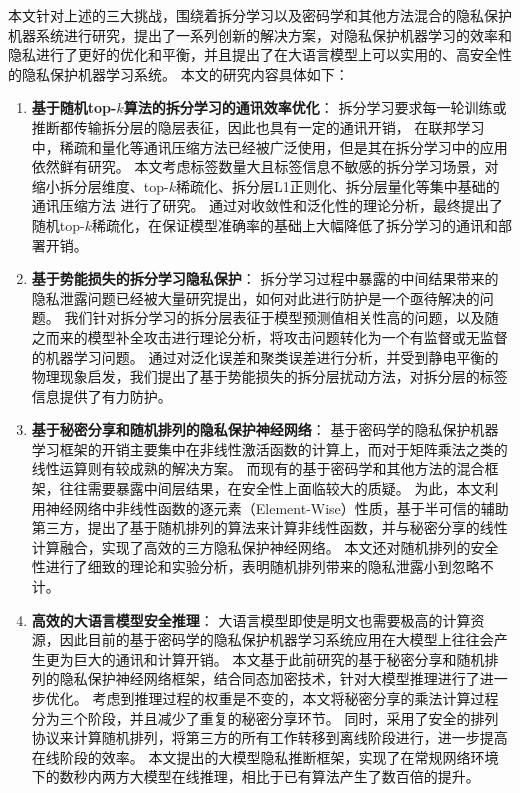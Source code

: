 本文针对上述的三大挑战，围绕着拆分学习以及密码学和其他方法混合的隐私保护机器系统进行研究，提出了一系列创新的解决方案，对隐私保护机器学习的效率和隐私进行了更好的优化和平衡，并且提出了在大语言模型上可以实用的、高安全性的隐私保护机器学习系统。
%
本文的研究内容具体如下：
%
\begin{enumerate}
    \item \textbf{基于随机top-$k$算法的拆分学习的通讯效率优化}：
    拆分学习要求每一轮训练或推断都传输拆分层的隐层表征，因此也具有一定的通讯开销，
    在联邦学习中，稀疏和量化等通讯压缩方法已经被广泛使用，但是其在拆分学习中的应用依然鲜有研究。
    本文考虑标签数量大且标签信息不敏感的拆分学习场景，对缩小拆分层维度、top-$k$稀疏化、拆分层L1正则化、拆分层量化等集中基础的通讯压缩方法
    进行了研究。
    通过对收敛性和泛化性的理论分析，最终提出了随机top-$k$稀疏化，在保证模型准确率的基础上大幅降低了拆分学习的通讯和部署开销。
    
    \item \textbf{基于势能损失的拆分学习隐私保护}：
    拆分学习过程中暴露的中间结果带来的隐私泄露问题已经被大量研究提出，如何对此进行防护是一个亟待解决的问题。
    我们针对拆分学习的拆分层表征于模型预测值相关性高的问题，以及随之而来的模型补全攻击进行理论分析，将攻击问题转化为一个有监督或无监督的机器学习问题。
    通过对泛化误差和聚类误差进行分析，并受到静电平衡的物理现象启发，我们提出了基于势能损失的拆分层扰动方法，对拆分层的标签信息提供了有力防护。
    \item \textbf{基于秘密分享和随机排列的隐私保护神经网络}：
    基于密码学的隐私保护机器学习框架的开销主要集中在非线性激活函数的计算上，而对于矩阵乘法之类的线性运算则有较成熟的解决方案。
    而现有的基于密码学和其他方法的混合框架，往往需要暴露中间层结果，在安全性上面临较大的质疑。
    为此，本文利用神经网络中非线性函数的逐元素（Element-Wise）性质，基于半可信的辅助第三方，提出了基于随机排列的算法来计算非线性函数，并与秘密分享的线性计算融合，实现了高效的三方隐私保护神经网络。
    本文还对随机排列的安全性进行了细致的理论和实验分析，表明随机排列带来的隐私泄露小到忽略不计。
 
    \item \textbf{高效的大语言模型安全推理}：
    大语言模型即使是明文也需要极高的计算资源，因此目前的基于密码学的隐私保护机器学习系统应用在大模型上往往会产生更为巨大的通讯和计算开销。
    本文基于此前研究的基于秘密分享和随机排列的隐私保护神经网络框架，结合同态加密技术，针对大模型推理进行了进一步优化。
    考虑到推理过程的权重是不变的，本文将秘密分享的乘法计算过程分为三个阶段，并且减少了重复的秘密分享环节。
    同时，采用了安全的排列协议来计算随机排列，将第三方的所有工作转移到离线阶段进行，进一步提高在线阶段的效率。
    本文提出的大模型隐私推断框架，实现了在常规网络环境下的数秒内两方大模型在线推理，相比于已有算法产生了数百倍的提升。
\end{enumerate}